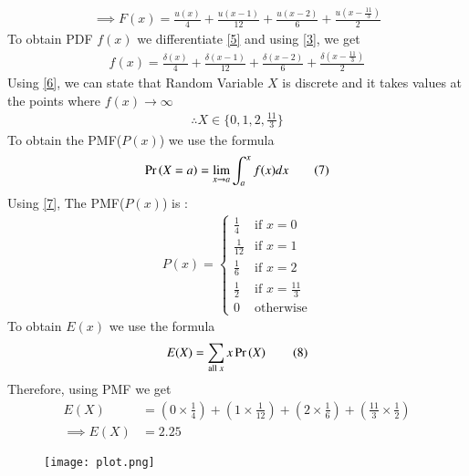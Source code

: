 \documentclass[journal,12pt,twocolumn]{IEEEtran}
\begin{document}
\begin{align*}
\implies F(x)=\frac{u(x)}{4}+\frac{u(x-1)}{12}+\frac{u(x-2)}{6}+\frac{u(x-\frac{11}{3})}{2} \tag{5} \label{5}
\end{align*}
\textrightarrow To obtain PDF $f(x)$ we differentiate \eqref{5} and using \eqref{3}, we get
\begin{align*}
f(x)=\frac{\delta(x)}{4}+\frac{\delta(x-1)}{12}+\frac{\delta(x-2)}{6}+\frac{\delta(x-\frac{11}{3})}{2} \tag{6} \label{6}
\end{align*}
\textrightarrow Using \eqref{6}, we can state that Random Variable $X$ is discrete and it takes values at the points where $f(x) \to \infty$ \\
\begin{align*}
\therefore X \in \{0, 1, 2, \frac{11}{3}\}
\end{align*}
\textrightarrow To obtain the PMF($P(x)$) we use the formula
\begin{align*}
\Pr\left(X=a\right) = \lim_{x\to a}\int_{a}^{x}f(x)dx \tag{7} \label{7}
\end{align*}
\textrightarrow Using \eqref{7}, The PMF($P(x)$) is :
\begin{align*}
P(x)=
\begin{cases}
\frac{1}{4} & \text{if } x=0 \\
\frac{1}{12} & \text{if } x=1 \\
\frac{1}{6} & \text{if } x=2 \\
\frac{1}{2} & \text{if } x=\frac{11}{3} \\
0 & \text{otherwise}
\end{cases}
\end{align*}
\textrightarrow To obtain $E(x)$ we use the formula
\begin{align*}
E(X) = \sum _{\text{all }x} x\Pr\left(X\right) \tag{8} \end{align*}
\textrightarrow Therefore, using PMF we get
\begin{align*}
E(X)& = (0\times \frac{1}{4}) + (1\times \frac{1}{12}) + (2\times \frac{1}{6}) + (\frac{11}{3}\times \frac{1}{2}) \\
\implies E(X) &= 2.25
\end{align*}
\newpage
\begin{figure}[h!]
    \centering
    \texttt{[image: plot.png]}
    \label{fig:1}
\end{figure}
\end{document}
